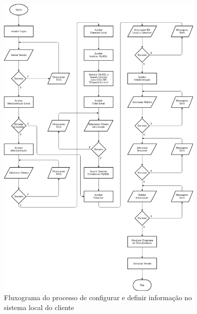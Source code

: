 \documentclass[11pt,twoside,a4paper]{report}
\begin{document}
\begin{figure}
	\vspace{-0.25cm}
	\begin{center}
		\includegraphics[width=0.9\textwidth]{fluxograma_administracao03} %
		\caption[Fluxograma do processo de configurar informação do cliente]{Fluxograma do processo de configurar e definir informação no sistema local do cliente}
		\label{fig:aplicacao_admin}
	\end{center}
\end{figure}

\cleardoublepage
\end{document}
